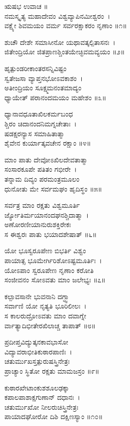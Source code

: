 
ಋಷಭ ಉವಾಚ ॥\\
ನಮಸ್ಕೃತ್ಯ ಮಹಾದೇವಂ ವಿಶ್ವವ್ಯಾಪಿನಮೀಶ್ವರಂ~।\\
ವಕ್ಷ್ಯೇ ಶಿವಮಯಂ ವರ್ಮ ಸರ್ವರಕ್ಷಾಕರಂ ನೃಣಾಂ ॥೧॥

ಶುಚೌ ದೇಶೇ ಸಮಾಸೀನೋ ಯಥಾವತ್ಕಲ್ಪಿತಾಸನಃ~।\\
ಜಿತೇಂದ್ರಿಯೋ ಜಿತಪ್ರಾಣಶ್ಚಿಂತಯೇಚ್ಛಿವಮವ್ಯಯಂ ॥೨॥

ಹೃತ್ಪುಂಡರೀಕಾಂತರಸನ್ನಿವಿಷ್ಟಂ\\ಸ್ವತೇಜಸಾ ವ್ಯಾಪ್ತನಭೋಽವಕಾಶಂ~।\\
ಅತೀಂದ್ರಿಯಂ ಸೂಕ್ಷ್ಮಮನಂತಮಾದ್ಯಂ\\ಧ್ಯಾಯೇತ್ ಪರಾನಂದಮಯಂ ಮಹೇಶಂ ॥೩॥

ಧ್ಯಾನಾವಧೂತಾಖಿಲಕರ್ಮಬಂಧ\\ಶ್ಚಿರಂ ಚಿದಾನಂದನಿಮಗ್ನಚೇತಾಃ~।\\
ಷಡಕ್ಷರನ್ಯಾಸ ಸಮಾಹಿತಾತ್ಮಾ\\ಶೈವೇನ ಕುರ್ಯಾತ್ಕವಚೇನ ರಕ್ಷಾಂ ॥೪॥

ಮಾಂ ಪಾತು ದೇವೋಽಖಿಲದೇವತಾತ್ಮಾ\\ಸಂಸಾರಕೂಪೇ ಪತಿತಂ ಗಭೀರೇ~।\\
ತನ್ನಾಮ ದಿವ್ಯಂ ಪರಮಂತ್ರಮೂಲಂ\\ಧುನೋತು ಮೇ ಸರ್ವಮಘಂ ಹೃದಿಸ್ಥಂ ॥೫॥

ಸರ್ವತ್ರ ಮಾಂ ರಕ್ಷತು ವಿಶ್ವಮೂರ್ತಿ\\ರ್ಜ್ಯೋತಿರ್ಮಯಾನಂದಘನಶ್ಚಿದಾತ್ಮಾ~।\\
ಅಣೋರಣೀಯಾನುರುಶಕ್ತಿರೇಕಃ\\ಸ ಈಶ್ವರಃ ಪಾತು ಭಯಾದಶೇಷಾತ್ ॥೬॥

ಯೋ ಭೂಸ್ವರೂಪೇಣ ಬಿಭರ್ತಿ ವಿಶ್ವಂ\\ಪಾಯಾತ್ಸ ಭೂಮೇರ್ಗಿರಿಶೋಽಷ್ಟಮೂರ್ತಿಃ~।\\
ಯೋಽಪಾಂ ಸ್ವರೂಪೇಣ ನೃಣಾಂ ಕರೋತಿ\\ಸಂಜೀವನಂ ಸೋಽವತು ಮಾಂ ಜಲೇಭ್ಯಃ ॥೭॥

ಕಲ್ಪಾವಸಾನೇ ಭುವನಾನಿ ದಗ್ಧ್ವಾ\\ಸರ್ವಾಣಿ ಯೋ ನೃತ್ಯತಿ ಭೂರಿಲೀಲಃ~।\\
ಸ ಕಾಲರುದ್ರೋಽವತು ಮಾಂ ದವಾಗ್ನೇ\\ರ್ವಾತ್ಯಾದಿಭೀತೇರಖಿಲಾಚ್ಚ ತಾಪಾತ್ ॥೮॥

ಪ್ರದೀಪ್ತವಿದ್ಯುತ್ಕನಕಾವಭಾಸೋ\\ವಿದ್ಯಾವರಾಭೀತಿಕುಠಾರಪಾಣಿಃ~।\\
ಚತುರ್ಮುಖಸ್ತತ್ಪುರುಷಸ್ತ್ರಿನೇತ್ರಃ\\ಪ್ರಾಚ್ಯಾಂ ಸ್ಥಿತೋ ರಕ್ಷತು ಮಾಮಜಸ್ರಂ ॥೯॥

ಕುಠಾರಖೇಟಾಂಕುಶಶೂಲಢಕ್ಕಾ\\ಕಪಾಲಪಾಶಾಕ್ಷಗುಣಾನ್ ದಧಾನಃ~।\\
ಚತುರ್ಮುಖೋ ನೀಲರುಚಿಸ್ತ್ರಿನೇತ್ರಃ\\ಪಾಯಾದಘೋರೋ ದಿಶಿ ದಕ್ಷಿಣಸ್ಯಾಂ ॥೧೦॥

